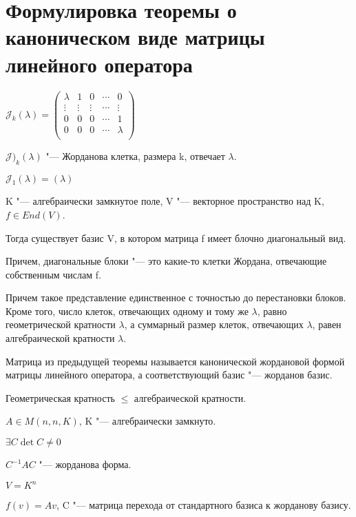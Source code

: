 ﻿\section{Формулировка теоремы о каноническом виде матрицы линейного оператора}
\begin{Def}
$\mathcal{J}_k(\lambda) = \begin{pmatrix}
\lambda&1&0&\cdots&0\\
\vdots&\vdots&\vdots&\cdots&\vdots\\
0&0&0&\cdots&1\\
0&0&0&\cdots&\lambda\\
\end{pmatrix}$

$\mathcal{J})_k(\lambda)$ "--- Жорданова клетка, размера k, отвечает $\lambda$.

$\mathcal{J}_1(\lambda) = (\lambda)$
\end{Def}

\begin{theorem}{}
K "--- алгебраически замкнутое поле, V "--- векторное пространство над K, 
$f \in End(V)$.

Тогда существует базис V, в котором матрица f имеет блочно диагональный вид.

Причем, диагональные блоки "--- это какие-то клетки Жордана, отвечающие собственным 
числам f.

Причем такое представление единственное с точностью до перестановки блоков.
Кроме того, число клеток, отвечающих одному и тому же $\lambda$, равно геометрической
кратности $\lambda$, а суммарный размер клеток, отвечающих $\lambda$, равен
алгебраической кратности $\lambda$. 
\end{theorem}

\begin{Def}
Матрица из предыдущей теоремы называется канонической жордановой формой
матрицы линейного оператора, а соответствующий базис "--- жорданов базис.
\end{Def}
\begin{conseq}
Геометрическая кратность $\le$ алгебраической кратности.
\end{conseq}

\begin{conseq}
$A \in M(n, n, K)$, K "--- алгебраически замкнуто.

$\exists C \det C \ne 0$

$C^{-1}AC$ "--- жорданова форма.

$V = K^{n}$

$f(v) = Av$, C "--- матрица перехода от стандартного базиса к жорданову базису.
\end{conseq}

